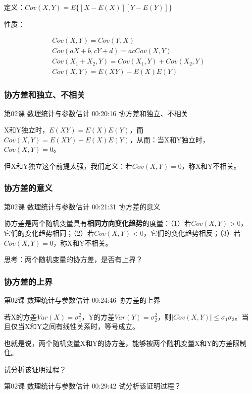 \documentclass[UTF8]{ctexart}
\begin{document}
定义：$Cov(X,Y)=E\{  [X-E(X)][Y-E(Y)] \}$

性质：

\begin{equation}
\begin{aligned}
Cov(X,Y)=Cov(Y,X) \\
Cov(aX+b,cY+d)=acCov(X,Y)\\
Cov(X_{1}+X_{2},Y)=Cov(X_{1},Y)+Cov(X_{2},Y) \\
Cov(X,Y)=E(XY)-E(X)E(Y)
\end{aligned}
\end{equation}


\subsubsection{协方差和独立、不相关}

第02课 数理统计与参数估计 00:20:16 协方差和独立、不相关

X和Y独立时，$E(XY)=E(X)E(Y)$，而$Cov(X,Y)=E(XY)-E(X)E(Y)$，从而：当X和Y独立时，$Cov(X,Y)=0$。

但X和Y独立这个前提太强，我们定义：若$Cov(X,Y)=0$，称X和Y不相关。

\subsubsection{协方差的意义}

第02课 数理统计与参数估计 00:21:31 协方差的意义

协方差是两个随机变量具有\textbf{相同方向变化趋势}的度量：（1）若$Cov(X,Y) > 0$，它们的变化趋势相同；（2）若$Cov(X,Y) < 0$，它们的变化趋势相反；（3）若$Cov(X,Y)=0$，称X和Y不相关。

思考：两个随机变量的协方差，是否有上界？

\subsubsection{协方差的上界}

第02课 数理统计与参数估计 00:24:46 协方差的上界

若X的方差$Var(X)=\sigma_{1}^{2}$，Y的方差$Var(Y)=\sigma_{2}^{2}$，则$|Cov(X,Y)| \leq \sigma_{1} \sigma_{2}$。当且仅当X和Y之间有线性关系时，等号成立。

也就是说，两个随机变量X和Y的协方差，能够被两个随机变量X和Y的方差限制住。

试分析该证明过程？

第02课 数理统计与参数估计 00:29:42 试分析该证明过程？
\end{document}
